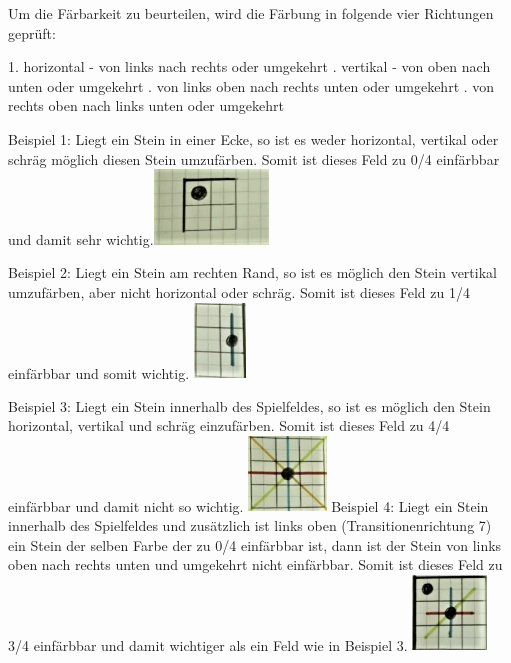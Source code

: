 \documentclass[12pt,a4paper,bibliography=totocnumbered,listof=totocnumbered]{scrartcl}
\begin{document}
Um die Färbarkeit zu beurteilen, wird die Färbung in folgende vier Richtungen geprüft:

1. horizontal - von links nach rechts oder umgekehrt . vertikal - von oben nach unten oder umgekehrt . von links oben nach rechts unten oder umgekehrt . von rechts oben nach links unten oder umgekehrt \newline
	
Beispiel 1: Liegt ein Stein in einer Ecke, so ist es weder horizontal, vertikal oder schräg möglich diesen Stein umzufärben. Somit ist dieses Feld zu 0/4 einfärbbar und damit sehr wichtig.\newline \includegraphics[height=2cm]{pics/beispiel1}

Beispiel 2: Liegt ein Stein am rechten Rand, so ist es möglich den Stein vertikal umzufärben, aber nicht horizontal oder schräg. Somit ist dieses Feld zu 1/4 einfärbbar und somit wichtig.\newline
\includegraphics[height=2cm]{pics/beispiel2}

Beispiel 3: Liegt ein Stein innerhalb des Spielfeldes, so ist es möglich den Stein horizontal, vertikal und schräg einzufärben. Somit ist dieses Feld zu 4/4 einfärbbar und damit nicht so wichtig.\newline
\includegraphics[height=2cm]{pics/beispiel3}
\newpage
Beispiel 4: Liegt ein Stein innerhalb des Spielfeldes und zusätzlich ist links oben (Transitionenrichtung 7) ein Stein der selben Farbe der zu 0/4 einfärbbar ist, dann ist der Stein von links oben nach rechts unten und umgekehrt nicht einfärbbar. Somit ist dieses Feld zu 3/4 einfärbbar und damit wichtiger als ein Feld wie in Beispiel 3.\newline
\includegraphics[height=2cm]{pics/beispiel4}
\end{document}

